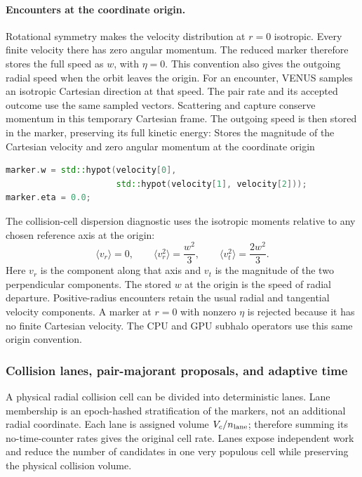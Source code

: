 \paragraph{Encounters at the coordinate origin.}
Rotational symmetry makes the velocity distribution at \(r=0\) isotropic.
Every finite velocity there has zero angular momentum.  The reduced marker
therefore stores the full speed as \(w\), with \(\eta=0\).  This convention
also gives the outgoing radial speed when the orbit leaves the origin.
For an encounter, VENUS samples an isotropic Cartesian direction at that
speed.  The pair rate and its accepted outcome use the same sampled vectors.
Scattering and capture conserve momentum in this temporary Cartesian frame.
The outgoing speed is then stored in the marker, preserving its full kinetic
energy:
{}
{Stores the magnitude of the Cartesian velocity and zero angular momentum
 at the coordinate origin}
\begin{lstlisting}[language=C++,basicstyle=\ttfamily\scriptsize]
marker.w = std::hypot(velocity[0],
                      std::hypot(velocity[1], velocity[2]));
marker.eta = 0.0;
\end{lstlisting}
The collision-cell dispersion diagnostic uses the isotropic moments relative
to any chosen reference axis at the origin:
\[
 \langle v_r\rangle=0,\qquad
 \langle v_r^2\rangle=\frac{w^2}{3},\qquad
 \langle v_t^2\rangle=\frac{2w^2}{3}. \tag{PIC36a}
\]
Here \(v_r\) is the component along that axis and \(v_t\) is the magnitude
of the two perpendicular components.  The stored \(w\) at the origin is the
speed of radial departure.  Positive-radius encounters retain the usual
radial and tangential velocity components.  A marker at \(r=0\) with
nonzero \(\eta\) is rejected because it has no finite Cartesian velocity.
The CPU and GPU subhalo operators use this same origin convention.

\subsubsection{Collision lanes, pair-majorant proposals, and adaptive time}

A physical radial collision cell can be divided into
 deterministic lanes.  Lane membership is an
epoch-hashed stratification of the markers, not an additional radial
coordinate.  Each lane is assigned volume \(V_c/n_{\rm lane}\); therefore
summing its no-time-counter rates gives the original cell rate.  Lanes expose
independent work and reduce the number of candidates in one very populous
cell while preserving the physical collision volume.

